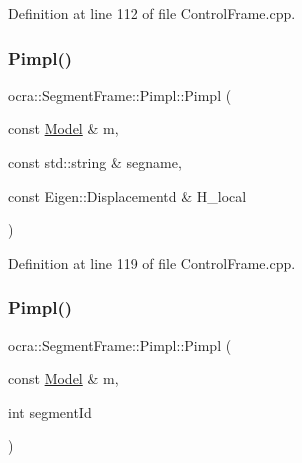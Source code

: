 Definition at line 112 of file Control\+Frame.\+cpp.

\hypertarget{structocra_1_1SegmentFrame_1_1Pimpl_a419d287d9da1582ff94dd9c3ab539f2b}{}\label{structocra_1_1SegmentFrame_1_1Pimpl_a419d287d9da1582ff94dd9c3ab539f2b} 
\subsubsection{\texorpdfstring{Pimpl()}{Pimpl()}\hspace{0.1cm}{\footnotesize\ttfamily [2/4]}}
{\footnotesize\ttfamily ocra\+::\+Segment\+Frame\+::\+Pimpl\+::\+Pimpl (\begin{DoxyParamCaption}\item[{const \hyperlink{classocra_1_1Model}{Model} \&}]{m,  }\item[{const std\+::string \&}]{segname,  }\item[{const Eigen\+::\+Displacementd \&}]{H\+\_\+local }\end{DoxyParamCaption})\hspace{0.3cm}{\ttfamily [inline]}}



Definition at line 119 of file Control\+Frame.\+cpp.

\hypertarget{structocra_1_1SegmentFrame_1_1Pimpl_a0de56572f8a4d14450c37bd71e432f2e}{}\label{structocra_1_1SegmentFrame_1_1Pimpl_a0de56572f8a4d14450c37bd71e432f2e} 
\subsubsection{\texorpdfstring{Pimpl()}{Pimpl()}\hspace{0.1cm}{\footnotesize\ttfamily [3/4]}}
{\footnotesize\ttfamily ocra\+::\+Segment\+Frame\+::\+Pimpl\+::\+Pimpl (\begin{DoxyParamCaption}\item[{const \hyperlink{classocra_1_1Model}{Model} \&}]{m,  }\item[{int}]{segment\+Id }\end{DoxyParamCaption})\hspace{0.3cm}{\ttfamily [inline]}}



